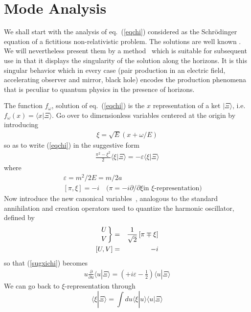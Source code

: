 \documentclass[12pt,oneside]{report}
\def\ket#1{|#1\rangle}
\def\braket#1#2{\mathrel{\langle #1|#2\rangle}}
\begin{document}
\section{Mode Analysis}\label{mode}
We shall start with the analysis of eq.~(\ref{eqchi}) considered as the 
Schr\"odinger equation of a fictitious non-relativistic problem.
The solutions are well known \cite{WiWa}.  We will nevertheless 
present them
by a method~\cite{PaBr0}
 which is suitable for subsequent use in that it displays
the singularity of the solution along the horizons. It is this singular
behavior which in every case (pair production in an electric field,
accelerating observer and mirror, black hole) encodes the
production phenomena
 that is peculiar to quantum physics in the presence of horizons.

The function $f_\omega$, solution of eq.~(\ref{eqchi})
is the $x$
representation of 
a ket 
$\ket{\Xi}$, i.e. $f_\omega (x)= \braket{x}{\Xi}$.
Go over to dimensionless variables centered at the origin by introducing
\begin{eqnarray}
\xi = \sqrt E \left(x + \omega/E \right) \label{2.3}
\end{eqnarray}
so as to write (\ref{eqchi}) in the suggestive form
\begin{eqnarray}
\frac{\pi^2 - \xi^2}{2} \langle \xi | \Xi \rangle = - \varepsilon
\langle \xi | \Xi \rangle \label{sugxichi}
\end{eqnarray}
where
\begin{eqnarray}
&& \varepsilon = m^2/2E = m/2a \label{2.5} \\
&& \left[\pi,\xi\right] = - i \quad \mbox{($\pi = - i \partial/\partial \xi$
in $\xi$-representation)} \nonumber
\end{eqnarray}
Now introduce the new canonical variables~\cite{BaVo}, analogous to
the standard annihilation and creation operators used to quantize the harmonic
oscillator, defined by \begin{eqnarray}
 \left. U \atop V \right\}& =& \frac{1}{\sqrt 2} 
\left[ \pi \mp \xi \right] \nonumber \\
 \left[ U,V \right]& =& - i \label{uvrep}
\end{eqnarray}
so that (\ref{sugxichi}) becomes
\begin{eqnarray}
u \frac{\partial}{\partial u} \langle u|\Xi \rangle =
\left(+ i \varepsilon - \frac 12 \right) \langle u | \Xi
\rangle \label{equchi}
\end{eqnarray}
We can go back to $\xi$-representation through
\begin{equation}
\langle \xi | \Xi \rangle = \int du \langle \xi | u \rangle
\langle u | \Xi  \rangle \label{xichi}
\end{equation}
\end{document}
